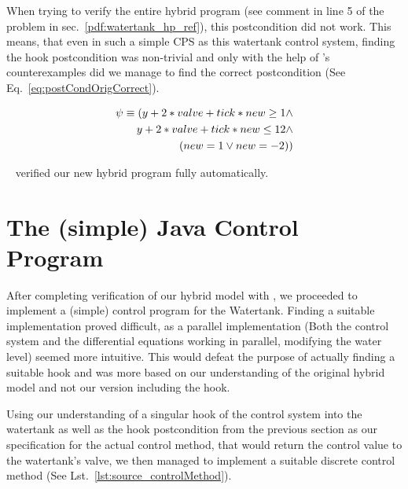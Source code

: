 When trying to verify the entire hybrid program (see comment in line 5 of the problem in sec.~\ref{pdf:watertank_hp_ref}), this postcondition did not work. This means, that even in such a simple CPS as this watertank control system, finding the hook postcondition was non-trivial and only with the help of \keym's counterexamples did we manage to find the correct postcondition (See Eq.~\ref{eq:postCondOrigCorrect}). 

\begin{equation}
	\centering
	\begin{split}
		\psi \equiv (y + 2 * valve + tick * new \geq 1 \wedge\\ y + 2 * valve + tick * new \leq 12 \wedge \\(new = 1  \vee new = -2))
	\end{split}
	\label{eq:postCondOrigCorrect}
\end{equation}

\keym~ verified our new hybrid program fully automatically.

\section{The (simple) Java Control Program}
\label{sec:Watertank:Java}

After completing verification of our hybrid model with \keym, we proceeded to implement a (simple) control program for the Watertank. Finding a suitable implementation proved difficult, as a parallel implementation (Both the control system and the differential equations working in parallel, modifying the water level) seemed more intuitive. This would defeat the purpose of actually finding a suitable hook and was more based on our understanding of the original hybrid model and not our version including the hook.

Using our understanding of a singular hook of the control system into the watertank as well as the hook postcondition from the previous section as our specification for the actual control method, that would return the control value to the watertank's valve, we then managed to implement a suitable discrete control method (See Lst.~\ref{lst:source_controlMethod}).

